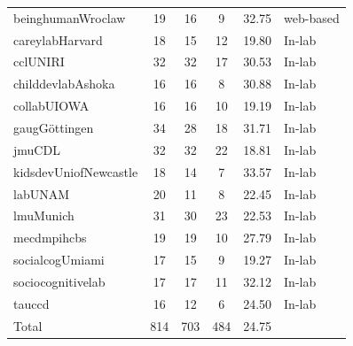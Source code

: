 \documentclass[
  english,
  man,floatsintext]{apa6}
\begin{document}
\begin{center}
\begin{ThreePartTable}
{\begin{longtable}{lccccl}
beinghumanWroclaw & 19 & 16 & 9 & 32.75 & web-based\\
careylabHarvard & 18 & 15 & 12 & 19.80 & In-lab\\
cclUNIRI & 32 & 32 & 17 & 30.53 & In-lab\\
childdevlabAshoka & 16 & 16 & 8 & 30.88 & In-lab\\
collabUIOWA & 16 & 16 & 10 & 19.19 & In-lab\\
gaugGöttingen & 34 & 28 & 18 & 31.71 & In-lab\\
jmuCDL & 32 & 32 & 22 & 18.81 & In-lab\\
kidsdevUniofNewcastle & 18 & 14 & 7 & 33.57 & In-lab\\
labUNAM & 20 & 11 & 8 & 22.45 & In-lab\\
lmuMunich & 31 & 30 & 23 & 22.53 & In-lab\\
mecdmpihcbs & 19 & 19 & 10 & 27.79 & In-lab\\
socialcogUmiami & 17 & 15 & 9 & 19.27 & In-lab\\
sociocognitivelab & 17 & 17 & 11 & 32.12 & In-lab\\
tauccd & 16 & 12 & 6 & 24.50 & In-lab\\
Total & 814 & 703 & 484 & 24.75 & \\
\bottomrule
\end{longtable}

}

\end{ThreePartTable}
\end{center}
\end{document}
